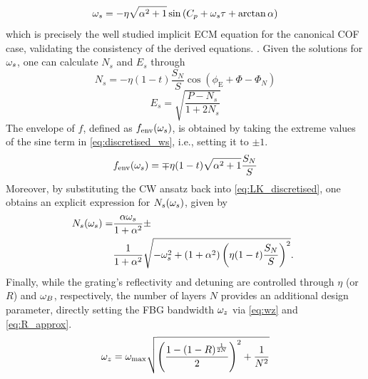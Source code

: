 %
\begin{equation*}
    \omega_s = - \eta \sqrt{\alpha^2+1} \sin{(C_p + \omega_s \tau + \arctan\alpha)}
\end{equation*}
%
which is precisely the well studied implicit ECM equation for the canonical COF case, validating the consistency of the derived equations. \cite{rottschafer2007ecm}.
Given the solutions for $\omega_s$, one can calculate $N_s$ and $E_s$ through
%
\begin{equation}
    N_s = -\eta (1-t) \frac{S_N}{S} \cos{\left( \phi_\text{E} + \Phi - \Phi_N \right)}  
\end{equation}
%
\begin{equation}
    E_s = \sqrt{\frac{P - N_s}{1 + 2 N_s}}
\end{equation}
%
The envelope of $f$, defined as $f_\text{env}(\omega_s)$, is obtained by taking the extreme values of the sine term in \eqref{eq:discretised_ws}, i.e., setting it to $\pm 1$.
%
\begin{equation}
    \label{eq:discretised_ws_envelope}
    f_\text{env}(\omega_s) = \mp \eta (1-t) \sqrt{\alpha^2+1}\frac{S_N}{S}
\end{equation}
%
Moreover, by substituting the CW ansatz back into \eqref{eq:LK_discretised}, one obtains an explicit expression for $N_s(\omega_s)$, given by
%
\begin{gather}
    \label{eq:discretised_Ns_curve}
    \begin{aligned}
        \hspace{-0.5em}N_s(\omega_s) = &\frac{\alpha \omega_s}{1+\alpha^2} \pm \\
                    &\frac{1}{1+\alpha^2}\sqrt{-\omega_s^2 + (1+\alpha^2) \left(\eta (1-t) \frac{S_N}{S} \right)^2}.    
    \end{aligned}
\end{gather}
%
Finally, while the grating’s reflectivity and detuning are controlled through $\eta$ (or $R$) and $\omega_B$, respectively, the number of layers $N$ provides an additional design parameter, directly setting the FBG bandwidth $\omega_z$ via \eqref{eq:wz} and \eqref{eq:R_approx}.
%
\begin{equation}
    \label{eq:wztoN}
    \omega_z = \omega_\text{max} \sqrt{\left( \frac{1 - (1 - R)^\frac{1}{2N}}{2} \right)^2 + \frac{1}{N^2}}
\end{equation}
%

